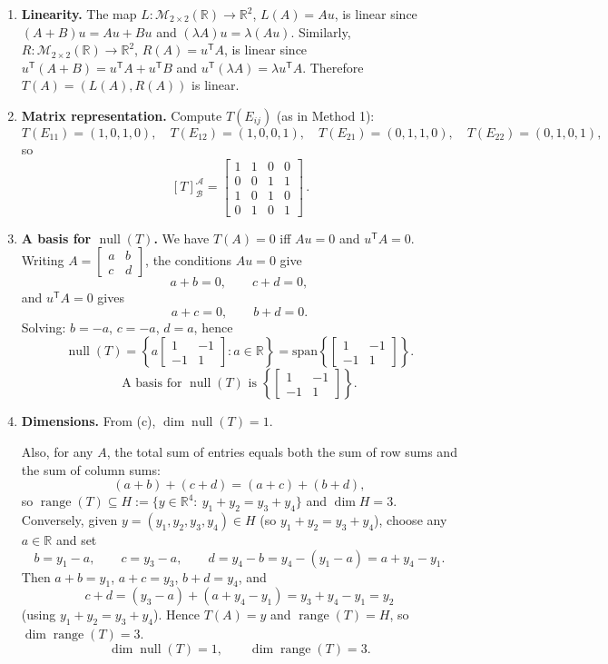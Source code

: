 \documentclass[12pt]{article}
\begin{document}
\begin{enumerate}[label=(\alph*)]
\item \textbf{Linearity.}
The map $L:\mathcal{M}_{2\times 2}(\mathbb{R})\to\mathbb{R}^2$, $L(A)=Au$, is linear since $(A+B)u=Au+Bu$ and $(\lambda A)u=\lambda(Au)$.
Similarly, $R:\mathcal{M}_{2\times 2}(\mathbb{R})\to\mathbb{R}^2$, $R(A)=u^{\mathsf T}A$, is linear since $u^{\mathsf T}(A+B)=u^{\mathsf T}A+u^{\mathsf T}B$ and $u^{\mathsf T}(\lambda A)=\lambda u^{\mathsf T}A$.
Therefore $T(A)=(L(A),R(A))$ is linear.

\item \textbf{Matrix representation.}
Compute $T(E_{ij})$ (as in Method 1):
\[
T(E_{11})=(1,0,1,0),\quad
T(E_{12})=(1,0,0,1),\quad
T(E_{21})=(0,1,1,0),\quad
T(E_{22})=(0,1,0,1),
\]
so
\[
\boxed{\, [T]_{\mathcal{B}}^{\mathcal{A}}=
\begin{bmatrix}
1&1&0&0\\
0&0&1&1\\
1&0&1&0\\
0&1&0&1
\end{bmatrix}\,}.
\]

\item \textbf{A basis for $\operatorname{null}(T)$.}
We have $T(A)=0$ iff $Au=0$ and $u^{\mathsf T}A=0$.
Writing $A=\begin{bmatrix}a&b\\c&d\end{bmatrix}$, the conditions $Au=0$ give
\[
a+b=0,\qquad c+d=0,
\]
and $u^{\mathsf T}A=0$ gives
\[
a+c=0,\qquad b+d=0.
\]
Solving: $b=-a$, $c=-a$, $d=a$, hence
\[
\operatorname{null}(T)=\left\{a\begin{bmatrix}1&-1\\-1&1\end{bmatrix}:a\in\mathbb{R}\right\}
=\mathrm{span}\left\{\begin{bmatrix}1&-1\\-1&1\end{bmatrix}\right\}.
\]
\[
\boxed{\,\text{A basis for }\operatorname{null}(T)\text{ is }\left\{\begin{bmatrix}1&-1\\-1&1\end{bmatrix}\right\}. \,}
\]

\item \textbf{Dimensions.}
From (c), $\dim\operatorname{null}(T)=1$.

Also, for any $A$, the total sum of entries equals both the sum of row sums and the sum of column sums:
\[
(a+b)+(c+d)=(a+c)+(b+d),
\]
so $\operatorname{range}(T)\subseteq H:=\{y\in\mathbb{R}^4:\ y_1+y_2=y_3+y_4\}$ and $\dim H=3$.
Conversely, given $y=(y_1,y_2,y_3,y_4)\in H$ (so $y_1+y_2=y_3+y_4$), choose any $a\in\mathbb{R}$ and set
\[
b=y_1-a,\qquad c=y_3-a,\qquad d=y_4-b=y_4-(y_1-a)=a+y_4-y_1.
\]
Then $a+b=y_1$, $a+c=y_3$, $b+d=y_4$, and
\[
c+d=(y_3-a)+(a+y_4-y_1)=y_3+y_4-y_1=y_2
\]
(using $y_1+y_2=y_3+y_4$). Hence $T(A)=y$ and $\operatorname{range}(T)=H$, so $\dim\operatorname{range}(T)=3$.
\[
\boxed{\,\dim\operatorname{null}(T)=1,\qquad \dim\operatorname{range}(T)=3.\,}
\]


\end{enumerate}
\end{document}
